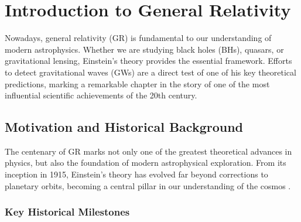 \chapter{Introduction to General Relativity}
\label{Introduction_to_General_Relativity}

Nowadays, general relativity (GR) is fundamental to our understanding of modern astrophysics. Whether we are studying black holes (BHs), quasars, or gravitational lensing, Einstein's theory provides the essential framework. Efforts to detect gravitational waves (GWs) are a direct test of one of his key theoretical predictions, marking a remarkable chapter in the story of one of the most influential scientific achievements of the 20th century.

\section{Motivation and Historical Background}

The centenary of GR marks not only one of the greatest theoretical advances in physics, but also the foundation of modern astrophysical exploration. From its inception in 1915, Einstein’s theory has evolved far beyond corrections to planetary orbits, becoming a central pillar in our understanding of the cosmos \cite{MaxPlanckChronology}.

\subsection{Key Historical Milestones}
\label{Key Historical Milestones}

